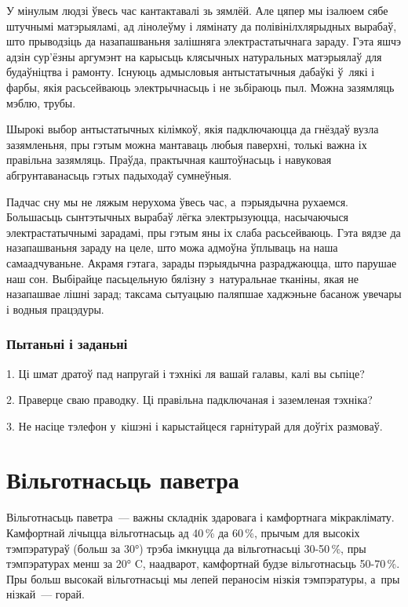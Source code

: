 У мінулым людзі ўвесь час кантактавалі зь зямлёй. Але цяпер мы ізалюем сябе штучнымі матэрыяламі, ад лінолеўму і лямінату да полівінілхлярыдных вырабаў, што прыводзіць да назапашваньня залішняга электрастатычнага зараду. Гэта яшчэ адзін сур'ёзны аргумэнт на карысьць клясычных натуральных матэрыялаў для будаўніцтва і рамонту. Існуюць адмысловыя антыстатычныя дабаўкі ў~лякі і фарбы, якія расьсейваюць электрычнасьць і не зьбіраюць пыл. Можна зазямляць мэблю, трубы.

Шырокі выбор антыстатычных кілімкоў, якія падключаюцца да гнёздаў вузла зазямленьня, пры гэтым можна мантаваць любыя паверхні, толькі важна іх правільна зазямляць. Праўда, практычная каштоўнасьць і навуковая абгрунтаванасьць гэтых падыходаў сумнеўныя.

Падчас сну мы не ляжым нерухома ўвесь час, а~пэрыядычна рухаемся. Большасьць сынтэтычных вырабаў лёгка электрызуюцца, насычаючыся электрастатычнымі зарадамі, пры гэтым яны іх слаба расьсейваюць. Гэта вядзе да назапашваньня зараду на целе, што можа адмоўна ўплываць на наша самаадчуваньне. Акрамя гэтага, зарады пэрыядычна разраджаюцца, што парушае наш сон. Выбірайце пасьцельную бялізну з~натуральнае тканіны, якая не назапашвае лішні зарад; таксама сытуацыю паляпшае хаджэньне басанож увечары і водныя працэдуры.

\subsubsection{Пытаньні і заданьні}

1. Ці шмат дратоў пад напругай і тэхнікі ля вашай галавы, калі вы сьпіце?

2. Праверце сваю праводку. Ці правільна падключаная і заземленая тэхніка?

3. Не насіце тэлефон у~кішэні і карыстайцеся гарнітурай для доўгіх размоваў.


\section{Вільготнасьць паветра}

Вільготнасьць паветра~--- важны складнік здаровага і камфортнага мікраклімату. Камфортнай лічыцца вільготнасьць ад 40\,\% да 60\,\%, прычым для высокіх тэмпэратураў (больш за 30°) трэба імкнуцца да вільготнасьці 30-50\,\%, пры тэмпэратурах менш за 20° C, наадварот, камфортнай будзе вільготнасьць 50-70\,\%. Пры больш высокай вільготнасьці мы лепей пераносім нізкія тэмпэратуры, а~пры нізкай~--- горай.

